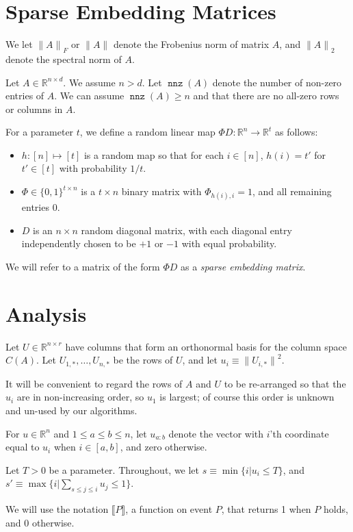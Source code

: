 \documentclass{sig-alternate}
\newcommand{\norm}[1]{{\| #1 \|}}
\DeclareMathOperator{\nnz}{\mathtt{nnz}}
\newcommand{\Ibr}[1]{\llbracket#1\rrbracket}
\newcommand{\R}{{\mathbb R}}
\begin{document}
\section{Sparse Embedding Matrices}\label{sec:sparse embed}

We let $\norm{A}_F$ or $\norm{A}$ denote the Frobenius norm of matrix $A$,
and $\norm{A}_2$ denote the spectral norm of $A$.

Let $A \in \mathbb{R}^{n \times d}$. We assume $n > d$. 
Let $\nnz(A)$ denote the number of non-zero entries of $A$. We can assume
$\nnz(A) \geq n$ and that there are no all-zero rows or columns in $A$. 

For a parameter $t$,
we define a random linear map $\Phi D: \mathbb{R}^n \rightarrow \mathbb{R}^t$ as follows:
\begin{itemize}
\item $h : [n] \mapsto [t]$ is a random map so that for each $i\in [n]$, $h(i)=t'$ for $t'\in [t]$ with
probability $1/t$.
\item $\Phi \in \{0,1\}^{t \times n}$ is a $t \times n$ binary 
matrix with $\Phi_{h(i), i} = 1$, and all remaining entries $0$.
\item $D$ is an $n \times n$ random diagonal matrix, with each diagonal
entry independently chosen to be $+1$ or $-1$ with equal probability.
\end{itemize} 
We will refer to a matrix of the form $\Phi D$ as a {\it sparse embedding matrix}.

\section{Analysis}\label{sec:analysis}
Let $U \in \mathbb{R}^{n \times r}$ have columns that form an
orthonormal basis for the column space $C(A)$. Let $U_{1, *}, \ldots, U_{n, *}$ be the rows
of $U$, and let $u_i\equiv \norm{U_{i,*}}^2$.


It will be convenient to regard the rows of $A$ and $U$ to be re-arranged so
that the $u_i$ are in non-increasing order, so $u_1$ is largest; of course
this order is unknown  and un-used by our algorithms.

For $u\in\R^n$ and $1\le a\le b\le n$,
let $u_{a:b}$ denote the vector with $i$'th coordinate equal to $u_i$ when $i\in [a,b]$,
and zero otherwise.

Let $T > 0$ be a parameter. Throughout, we let $s\equiv \min\{i | u_i \le T\}$,
and $s'\equiv \max\{i | \sum_{s \le j\le i} u_j \le 1\}$.

We will use the notation $\Ibr{P}$, a function on event $P$, that returns 1 when
$P$ holds, and 0 otherwise.
\end{document}
